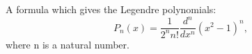 A formula which gives the Legendre polynomials:
\[ P_n (x) = \frac{1}{2^n n!} \frac{d^n}{dx^n} (x^2 -1 ) ^n , \]
where n is a natural number.